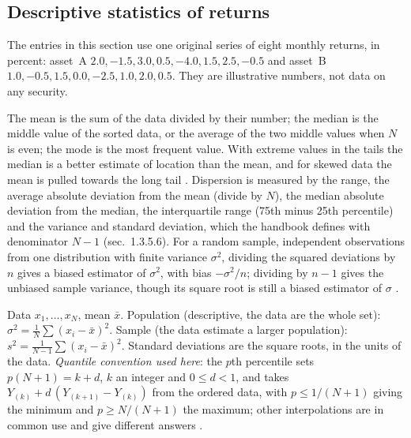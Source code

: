 \subsection{Descriptive statistics of returns}

The entries in this section use one original series of eight monthly returns, in percent: asset~A $2.0, -1.5, 3.0, 0.5, -4.0, 1.5, 2.5, -0.5$ and asset~B $1.0, -0.5, 1.5, 0.0, -2.5, 1.0, 2.0, 0.5$. They are illustrative numbers, not data on any security.

\begin{qfdefinition}\label{def:return-sample-statistics}
 The mean is the sum of the data divided by their number; the median is the middle value of the sorted data, or the average of the two middle values when $N$ is even; the mode is the most frequent value. With extreme values in the tails the median is a better estimate of location than the mean, and for skewed data the mean is pulled towards the long tail \citep[sec.~1.3.5.1]{statistical-methods-handbook}. Dispersion is measured by the range, the average absolute deviation from the mean (divide by $N$), the median absolute deviation from the median, the interquartile range (75th minus 25th percentile) and the variance and standard deviation, which the handbook defines with denominator $N-1$ (sec.~1.3.5.6). For a random sample, independent observations from one distribution with finite variance $\sigma^2$, dividing the squared deviations by $n$ gives a biased estimator of $\sigma^2$, with bias $-\sigma^2/n$; dividing by $n-1$ gives the unbiased sample variance, though its square root is still a biased estimator of $\sigma$ \citep[sec.~8.2.2]{probability-statistics-random-processes}.

 Data $x_1,\dots,x_N$, mean $\bar x$. Population (descriptive, the data are the whole set): $\sigma^2=\frac1N\sum(x_i-\bar x)^2$. Sample (the data estimate a larger population): $s^2=\frac1{N-1}\sum(x_i-\bar x)^2$. Standard deviations are the square roots, in the units of the data. \emph{Quantile convention used here}: the $p$th percentile sets $p(N+1)=k+d$, $k$ an integer and $0\le d<1$, and takes $Y_{(k)}+d\,(Y_{(k+1)}-Y_{(k)})$ from the ordered data, with $p\le1/(N+1)$ giving the minimum and $p\ge N/(N+1)$ the maximum; other interpolations are in common use and give different answers \citep[sec.~7.2.6.2]{statistical-methods-handbook}.


\end{qfdefinition}
